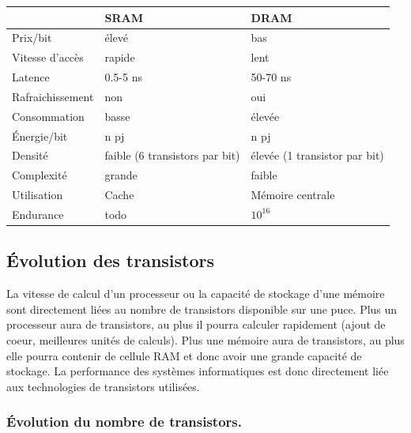 \begin{table}[]
\begin{tabular}{l|l|l|}
\cline{2-3}
                                       & SRAM     & DRAM             \\ \hline
\multicolumn{1}{|l|}{Prix/bit}         & élevé    & bas              \\ \hline
\multicolumn{1}{|l|}{Vitesse d'accès}  & rapide   & lent             \\ \hline
\multicolumn{1}{|l|}{Latence}          & 0.5-5 ns & 50-70 ns        \\ \hline
\multicolumn{1}{|l|}{Rafraichissement} & non      & oui              \\ \hline
\multicolumn{1}{|l|}{Consommation}     & basse    & élevée           \\ \hline
\multicolumn{1}{|l|}{Énergie/bit}      & n pj     & n pj             \\ \hline
\multicolumn{1}{|l|}{Densité}          & faible (6 transistors par bit)   & élevée (1 transistor par bit)          \\ \hline
\multicolumn{1}{|l|}{Complexité}       & grande   & faible           \\ \hline
\multicolumn{1}{|l|}{Utilisation}      & Cache    & Mémoire centrale \\ \hline
\multicolumn{1}{|l|}{Endurance}        & todo     & $10^{16}$           \\ \hline
\end{tabular}
\end{table}




\subsection{Évolution des transistors}


La vitesse de calcul d'un processeur ou la capacité de stockage d'une mémoire sont directement liées au nombre de transistors disponible sur une puce. 
Plus un processeur aura de transistors, au plus il pourra calculer rapidement (ajout de coeur, meilleures unités de calculs). Plus une mémoire aura de transistors, au plus elle pourra contenir de cellule RAM et donc avoir une grande capacité de stockage. La performance des systèmes informatiques est donc directement liée aux technologies de transistors utilisées. 


\subsubsection{Évolution du nombre de transistors.}

